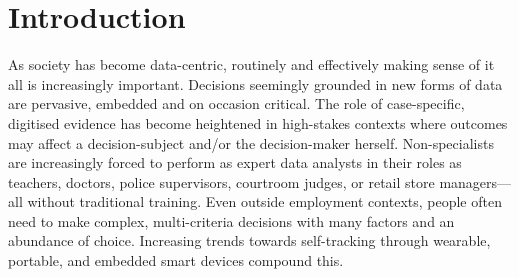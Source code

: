 \documentclass[sigchi-a, authorversion]{acmart}
\begin{document}

\maketitle







\section{Introduction}
As society has become data-centric, routinely and effectively making sense of it all is increasingly important. Decisions seemingly grounded in new forms of data are pervasive, embedded and on occasion critical. The role of case-specific, digitised evidence has become heightened in high-stakes contexts where outcomes may affect a decision-subject and/or the decision-maker herself. Non-specialists are increasingly forced to perform as expert data analysts in their roles as teachers, doctors, police supervisors, courtroom judges, or retail store managers---all without traditional training.  Even outside employment contexts, people often need to make complex, multi-criteria decisions with many factors and an abundance of choice. Increasing trends towards self-tracking through wearable, portable, and embedded smart devices compound this.
\end{document}
